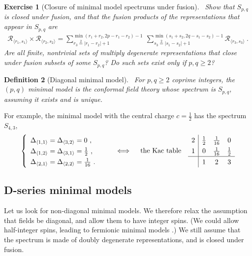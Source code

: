 \documentclass[12pt, a4paper]{article}
\theoremstyle{break}
\newtheorem{exo}{Exercise}[section]
\newtheorem{defn}[exo]{Definition}
\begin{document}
\begin{exo}[Closure of minimal model spectrums under fusion]
 ~\label{exo:cmm}
 Show that $S_{p,q}$ is closed under fusion, and that the fusion products of the representations that appear in $S_{p,q}$ are
 \begin{align}
  \mathcal{R}_{\langle r_1,s_1 \rangle} \times \mathcal{R}_{\langle r_2,s_2 \rangle} = \sum_{r_3\overset{2}{=}|r_1-r_2|+1}^{\min(r_1+r_2,2p-r_1-r_2)-1}\ \sum_{s_3\overset{2}{=}|s_1-s_2|+1}^{\min(s_1+s_2,2q-s_1-s_2)-1} \mathcal{R}_{\langle r_3,s_3 \rangle}\ .
\label{rrmm}
\end{align}
 Are all finite, nontrivial sets of multiply degenerate representations that close under fusion subsets of some $S_{p,q}$? Do such sets exist only if $p,q\geq 2$?
\end{exo}

\begin{defn}[Diagonal minimal model]
 ~\label{def:dmm}
 For $p,q\geq 2$ coprime integers, the $(p,q)$ minimal model is the conformal field theory whose spectrum is $S_{p, q}$, assuming it exists and is unique.
\end{defn}
For example, the minimal model with the central charge $c=\frac12$ has the spectrum $S_{4,3}$, 
\begin{align}
\renewcommand{\arraystretch}{1.3}
 \left\{\begin{array}{l} \Delta_{\langle 1,1\rangle}=\Delta_{\langle 3,2\rangle} = 0 \ , \\ \Delta_{\langle 1,2\rangle} =\Delta_{\langle 3,1\rangle} = \frac12 \ , \\ \Delta_{\langle 2,1\rangle} =\Delta_{\langle 2,2\rangle} = \frac{1}{16} \ .\end{array}\right. 
 \qquad \iff \quad \text{the Kac table} \quad 
 \begin{array}{c|ccc} 2 & \frac{1}{2} & \frac{1}{16} & 0 \\ 1 & 0 & \frac{1}{16} & \frac{1}{2} \\  \hline & 1 & 2 & 3 \end{array} 
\end{align}

\subsection{D-series minimal models}\label{sec:dmm}

Let us look for non-diagonal minimal models. We therefore relax the assumption that fields be diagonal, and allow them to have integer spins. (We could allow half-integer spins, leading to fermionic minimal models \cite{pet88}.) We still assume that the spectrum is made of doubly degenerate representations, and is closed under fusion.
\end{document}
